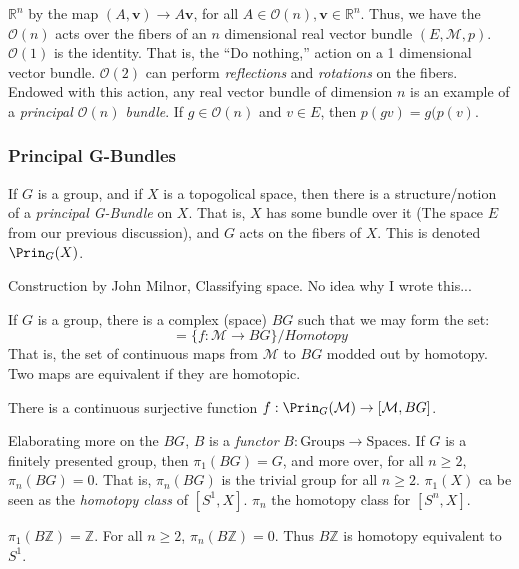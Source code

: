             $\mathbb{R}^{n}$ by the map
            $(A,\mathbf{v})\rightarrow{A\mathbf{v}}$,
            for all $A\in\mathcal{O}(n),\mathbf{v}\in\mathbb{R}^{n}$.
            Thus, we have the $\mathcal{O}(n)$ acts over the fibers
            of an $n$ dimensional real vector bundle
            $(E,\mathcal{M},p)$. $\mathcal{O}(1)$ is the identity.
            That is, the ``Do nothing,'' action on a 1 dimensional
            vector bundle. $\mathcal{O}(2)$ can perform
            \textit{reflections} and \textit{rotations} on the
            fibers. Endowed with this action, any real
            vector bundle of dimension $n$ is an example of
            a \textit{principal $\mathcal{O}(n)$ bundle}.
            If $g\in\mathcal{O}(n)$ and $v\in{E}$,
            then $p(gv)=g(p(v)$.
        \subsubsection{Principal G-Bundles}
            If $G$ is a group, and if $X$ is a
            topogolical space, then there is a
            structure/notion of a
            \textit{principal G-Bundle} on $X$.
            That is, $X$ has some bundle over it
            (The space $E$ from our previous discussion),
            and $G$ acts on the fibers of $X$. This is
            denoted $\Prin_{G}(X)$.
            \par\hfill\par
            Construction by John Milnor, Classifying space.
            No idea why I wrote this...
            \par\hfill\par
            If $G$ is a group, there is a complex (space) $BG$
            such that we may form the set:
            \begin{equation*}
                [\mathcal{M},BG]
                =\{f:\mathcal{M}\rightarrow{BG}\}/Homotopy
            \end{equation*}
            That is, the set of continuous maps from $\mathcal{M}$ to
            $BG$ modded out by homotopy. Two maps are equivalent if they
            are homotopic.
            \begin{theorem}
                There is a continuous surjective function
                $f:\Prin_{G}(\mathcal{M})\rightarrow%
                 [\mathcal{M},BG]$.
            \end{theorem}
            Elaborating more on the $BG$,
            $B$ is a \textit{functor}
            $B:\textrm{Groups}\rightarrow\textrm{Spaces}$.
            If $G$ is a finitely presented group,
            then $\pi_{1}(BG)=G$, and more over,
            for all $n\geq{2}$,
            $\pi_{n}(BG)=0$. That is, $\pi_{n}(BG)$
            is the trivial group for all $n\geq{2}$.
            $\pi_{1}(X)$ ca be seen as the
            \textit{homotopy class} of $[S^{1},X]$.
            $\pi_{n}$ the homotopy class for
            $[S^{n},X]$.
            \begin{example}
                $\pi_{1}(B\mathbb{Z})=\mathbb{Z}$.
                For all $n\geq{2}$,
                $\pi_{n}(B\mathbb{Z})=0$.
                Thus $B\mathbb{Z}$ is homotopy
                equivalent to $S^{1}$.
            \end{example}
